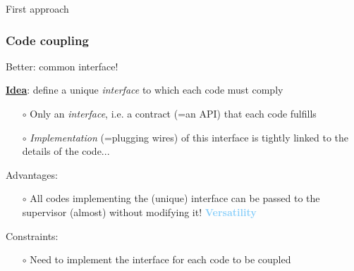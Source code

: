 \documentclass[10pt, hyperref={unicode=true,pdfusetitle, bookmarks=true,bookmarksnumbered=false,bookmarksopen=false, breaklinks=false,pdfborder={0 0 1},backref=true,colorlinks=true,linkcolor=darkblue,pageanchor, urlcolor=darkblue}]{beamer}
\begin{document}
\begin{frame}
\begin{block}{First approach}
\end{block}
\end{frame}
\begin{frame}
\frametitle{Code coupling}
\begin{block}{Better: common interface!}


\underline{\textbf{Idea}}: define a unique \textit{interface} to which each code must comply
    \begin{itemize}
    \item [$\circ$] Only an \textit{interface}, i.e. a contract (=an API) that each code fulfills
    \item [$\circ$] \textit{Implementation} (=plugging wires) of this interface is tightly linked to the details of the code...
    \end{itemize}
Advantages:
    \begin{itemize}
    \item [$\circ$] All codes implementing the (unique) interface can be passed to the supervisor (almost) without modifying it! \textbf{\textcolor{LightSkyBlue}{Versatility}}
    \end{itemize}
Constraints:
    \begin{itemize}
    \item [$\circ$] Need to implement the interface for each code to be coupled
    \end{itemize}


\end{block}
\end{frame}
\end{document}
